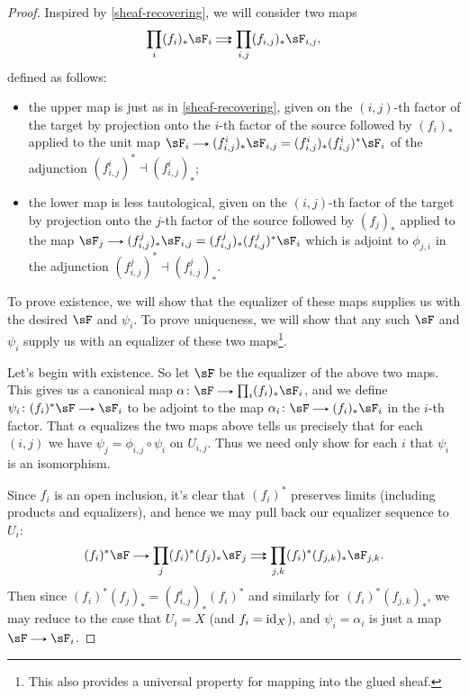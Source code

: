 \begin{proof}
  Inspired by \cref{sheaf-recovering}, we will consider two maps
  \[
    \prod_i (f_i)_*\sF_i \doubto \prod_{i,j} (f_{i,j})_*\sF_{i,j},
  \]
  defined as follows:
  \begin{itemize}
  \item the upper map is just as in \cref{sheaf-recovering}, given on the $(i,j)$-th factor of the target by projection onto the $i$-th factor of the source followed by $(f_i)_*$ applied to the unit map $\sF_i \to (f^i_{i,j})_*\sF_{i,j} = (f^i_{i,j})_*(f^i_{i,j})^*\sF_i$ of the adjunction $(f^i_{i,j})^* \dashv (f^i_{i,j})_*$;
  \item the lower map is less tautological, given on the $(i,j)$-th factor of the target by projection onto the $j$-th factor of the source followed by $(f_j)_*$ applied to the map $\sF_j \to (f^j_{i,j})_*\sF_{i,j} = (f^j_{i,j})_*(f^j_{i,j})^*\sF_i$ which is adjoint to $\phi_{j,i}$ in the adjunction $(f^j_{i,j})^* \dashv (f^j_{i,j})_*$.
  \end{itemize}
  To prove existence, we will show that the equalizer of these maps supplies us with the desired $\sF$ and $\psi_i$. To prove uniqueness, we will show that any such $\sF$ and $\psi_i$ supply us with an equalizer of these two maps\footnote{This also provides a universal property for mapping into the glued sheaf.}.

  Let's begin with existence. So let $\sF$ be the equalizer of the above two maps. This gives us a canonical map $\alpha \c \sF \to \prod_i (f_i)_*\sF_i$, and we define $\psi_i \c (f_i)^*\sF \to \sF_i$ to be adjoint to the map $\alpha_i \c \sF \to (f_i)_*\sF_i$ in the $i$-th factor. That $\alpha$ equalizes the two maps above tells us precisely that for each $(i,j)$ we have $\psi_j = \phi_{i,j} \circ \psi_i$ on $U_{i,j}$. Thus we need only show for each $i$ that $\psi_i$ is an isomorphism.

  Since $f_i$ is an open inclusion, it's clear that $(f_i)^*$ preserves limits (including products and equalizers), and hence we may pull back our equalizer sequence to $U_i$:
  \[
    (f_i)^*\sF \to \prod_j (f_i)^*(f_j)_*\sF_j \doubto \prod_{j,k} (f_i)^*(f_{j,k})_*\sF_{j,k}.
  \]
  Then since $(f_i)^*(f_j)_* = (f^i_{i,j})_*(f_i)^*$ and similarly for $(f_i)^*(f_{j,k})_*$, we may reduce to the case that $U_i = X$ (and $f_i = \mathrm{id}_X$), and $\psi_i = \alpha_i$ is just a map $\sF \to \sF_i$.


\end{proof}
